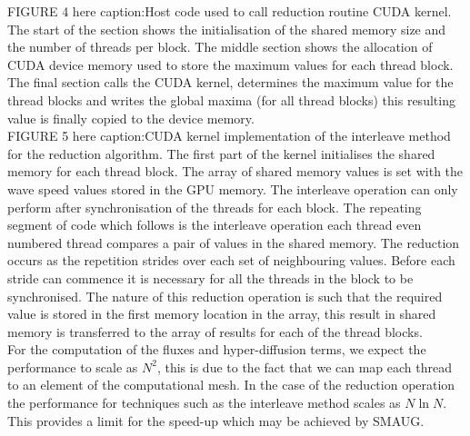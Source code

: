 \documentclass[final,1p]{elsarticle}
\begin{document}
FIGURE 4 here caption:Host code used to call reduction routine CUDA kernel. The start of the section shows the initialisation of the shared memory size and the number of threads per block. The middle section shows the allocation of CUDA device memory used to store the maximum values for each thread block. The final section calls the CUDA kernel, determines the maximum value for the thread blocks and writes the global maxima (for all thread blocks)  this resulting value is finally copied to the device memory.\\

FIGURE 5 here caption:CUDA kernel implementation of the interleave method for the reduction algorithm. The first part of the kernel initialises the shared memory for each thread block. The array of shared memory values is set with the wave speed values stored in the GPU memory. The interleave operation can only perform after synchronisation of the threads for each block. The repeating segment of code which follows is the interleave operation each thread even numbered thread compares a pair of values in the shared memory. The reduction occurs as the repetition strides over each set of neighbouring values. Before each stride can commence it is necessary for all the threads in the block to be synchronised. The nature of this reduction operation is such that the required value is stored in the first memory location in the array, this result in shared memory is transferred to the array of results for each of the thread blocks.\\

For the computation of the fluxes and hyper-diffusion terms, we expect the performance to scale as $N^{2}$, this is due to the fact that we can map each thread to an element of the computational mesh. In the case of the reduction operation the performance for techniques such as the interleave method scales as $N \ln N$. This provides a limit for the speed-up which may be achieved by SMAUG.

\end{document}
